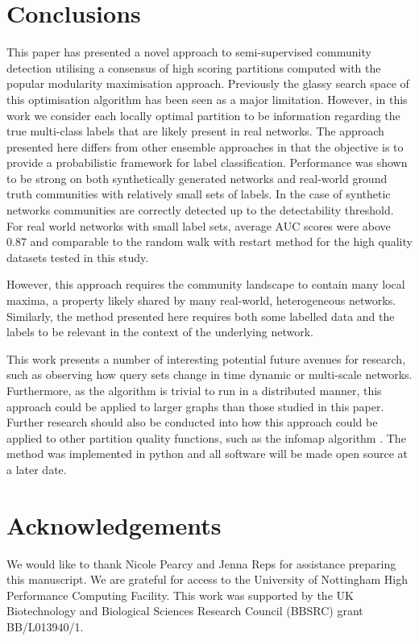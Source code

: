 \documentclass[sigconf]{acmart}
\begin{document}
\section{Conclusions}
This paper has presented a novel approach to semi-supervised community detection utilising a consensus of high scoring partitions computed with the popular modularity maximisation approach.
Previously the glassy search space of this optimisation algorithm has been seen as a major limitation.
However, in this work we consider each locally optimal partition to be information regarding the true multi-class labels that are likely present in real networks.
The approach presented here differs from other ensemble approaches in that the objective is to provide a probabilistic framework for label classification.
Performance was shown to be strong on both synthetically generated networks and real-world ground truth communities with relatively small sets of labels.
In the case of synthetic networks communities are correctly detected up to the detectability threshold.
For real world networks with small label sets, average AUC scores were above 0.87 and comparable to the random walk with restart method for the high quality datasets tested in this study.

However, this approach requires the community landscape to contain many local maxima, a property likely shared by many real-world, heterogeneous networks.
Similarly, the method presented here requires both some labelled data and the labels to be relevant in the context of the underlying network.

This work presents a number of interesting potential future avenues for research, such as observing how query sets change in time dynamic or multi-scale networks.
Furthermore, as the algorithm is trivial to run in a distributed manner, this approach could be applied to larger graphs than those studied in this paper.
Further research should also be conducted into how this approach could be applied to other partition quality functions, such as the infomap algorithm \cite{Rosvall:2008fi}.
The method was implemented in python and all software will be made open source at a later date.

\section*{Acknowledgements}
We would like to thank Nicole Pearcy and Jenna Reps for assistance preparing this manuscript.
We are grateful for access to the University of Nottingham High Performance Computing Facility.
This work was supported by the UK Biotechnology and Biological Sciences Research Council (BBSRC) grant BB/L013940/1.

 

\end{document}
